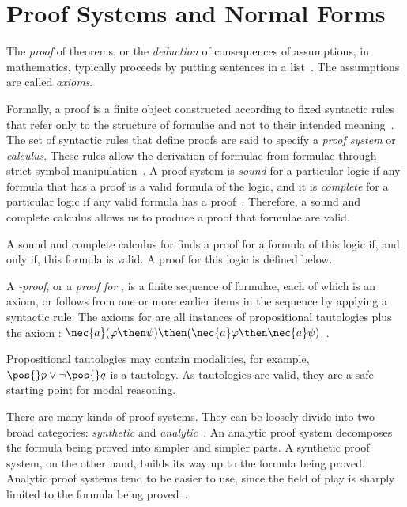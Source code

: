 \section{Proof Systems and Normal Forms}


The \emph{proof} of theorems, or the \emph{deduction} of consequences of
assumptions, in mathematics, typically proceeds by putting sentences in a
list~\cite{kleene2002mathematical}. The assumptions are called \emph{axioms}.

Formally, a proof is a finite object constructed according to fixed syntactic
rules that refer only to the structure of formulae and not to their intended
meaning~\cite{fitting}. The set of syntactic rules that define proofs are said
to specify a \emph{proof system} or \emph{calculus}. These rules allow the
derivation of formulae from formulae through strict symbol
manipulation~\cite{resolutionbased}. A proof system is \emph{sound} for a
particular logic if any formula that has a proof is a valid formula of the
logic, and it is \emph{complete} for a particular logic if any valid formula has
a proof~\cite{fitting}. Therefore, a sound and complete calculus allows us to
produce a proof that formulae are valid. 

A sound and complete calculus for  finds a proof for a formula of
this logic if, and only if, this formula is valid. A proof for this
logic is defined below.

\begin{definition}%
\label{def:kproof}
    A \emph{-proof}, or a \emph{proof for }, is a
    finite sequence of formulae, each of which is an axiom, or follows from one
    or more earlier items in the sequence by applying a syntactic rule. The
    axioms for  are all instances of propositional tautologies
    plus the axiom  : $\nec{a}(\varphi \then \psi) \then (\nec{a}
    \varphi \then \nec{a} \psi)$~\cite{blackburn2002modal}.
\end{definition}

Propositional tautologies may contain modalities, for example, $\pos{}p \lor
\neg \pos{} q$ is a tautology. As tautologies are valid, they are a safe
starting point for modal reasoning. 

There are many kinds of proof systems. They can be loosely divide into two broad
categories: \emph{synthetic} and \emph{analytic}~\cite{fitting}. An analytic
proof system decomposes the formula being proved into simpler and simpler parts.
A synthetic proof system, on the other hand, builds its way up to the formula being
proved. Analytic proof systems tend to be easier to use, since the field of
play is sharply limited to the formula being proved~\cite{fitting}. 

